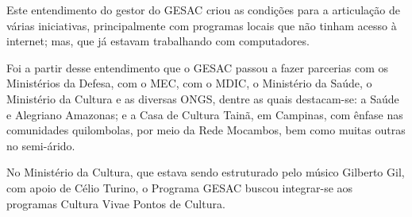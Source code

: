 \documentclass[
12pt,		%
openright,	%
twoside,  %
a4paper,			%
chapter=TITLE,		%
english,			%
french,				%
spanish,			%
brazil				%
]{USPSC-classe/USPSC}
\begin{document}
Este entendimento do gestor do GESAC criou as condi\c{c}\~oes para a articula\c{c}\~ao de v\'arias iniciativas, principalmente com programas locais que n\~ao tinham acesso \`a internet; mas, que j\'a estavam trabalhando com computadores.

















Foi a partir desse entendimento que o GESAC passou a fazer parcerias com os Minist\'erios da Defesa, com o MEC, com o MDIC, o Minist\'erio da Sa\'ude, o Minist\'erio da Cultura e as diversas ONGS, dentre as quais destacam-se: a \textquotedbl Sa\'ude e Alegria\textquotedbl  no Amazonas; e a \textquotedbl Casa de Cultura Tain\~a\textquotedbl , em Campinas, com \^enfase nas comunidades quilombolas, por meio da Rede Mocambos, bem como muitas outras no semi-\'arido.


















\noindent\begin{center}\mbox{\centering{}}\end{center}


No Minist\'erio da Cultura, que estava sendo estruturado pelo m\'usico Gilberto Gil, com apoio de C\'elio Turino, o Programa GESAC buscou integrar-se aos programas \textquotedbl Cultura Viva\textquotedbl  e \textquotedbl Pontos de Cultura\textquotedbl .
\end{document}
